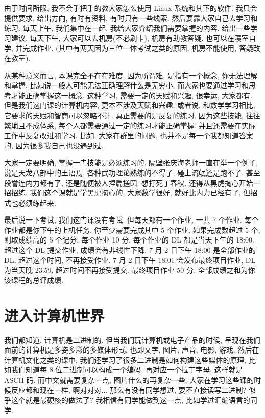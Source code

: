 \documentclass[a4paper]{ctexart}
\begin{document}
由于时间所限, 我不会手把手的教大家怎么使用 Linux 系统和其下的软件. 我只会提供要求, 给出方向,
有时有资料, 有时只有一些线索. 然后要靠大家自己去学习和练习. 每天上午, 我们集中在一起,
我给大家介绍我们需要掌握的内容, 给出一些学习建议. 每天下午, 大家可以去机房(不必刷卡), 机房有助教答疑.
也可以在寝室自学, 并完成作业. (其中有两天因为三位一体考试之类的原因, 机房不能使用, 答疑改在教室).

从某种意义而言, 本课完全不存在难度. 因为所谓难, 是指有一个概念, 你无法理解和掌握.
比如说一般人可能无法正确理解什么是无穷小, 而大家也要通过学习和思考才能正确掌握这一概念. 这种学习,
需要一定的天赋和兴趣, 很幸运, 大家都有. 但是我们这门课的计算机内容, 更本不涉及天赋和兴趣. 或者说,
和数学学习相比, 它要求的天赋和智商可以忽略不计. 真正需要的是反复的练习. 因为这些技能,
往往繁琐且不成体系, 每个人都需要通过一定的练习才能正确掌握. 并且还需要在实际工作中反复改进和学习.
比如, 大家在群里的问题, 也并不是每一个我都知道答案的, 因为很多我自己也没遇到过.

大家一定要明确, 掌握一门技能是必须练习的. 隔壁张庆海老师一直在举一个例子, 说是天龙八部中的王语焉,
各种武功理论熟练的不得了, 碰上流氓还是跑不了. 甚至段誉连内力都有了, 还是随便被人捏扁搓圆.
想打死丁春秋, 还得从黑虎掏心开始一招招练. 我们这个课就是学黑虎掏心的, 大家数学很好, 就好比内力已经有了, 但招式也必须练起来.

最后说一下考试, 我们这门课没有考试. 但每天都有一个作业, 一共 7 个作业.
每个作业都是你下午的上机任务. 你至少需要完成其中 5 个作业, 如果完成数超过 5 个,
则取成绩高的 5 个记分. 每个作业 10 分. 每个作业的 DL 都是当天下午的 18:00.
超过这个 DL 提交作业, 成绩会有非线性下降. 7 月 2 日下午 18:00 是全部作业的 DL,
超过这个时间, 不再接受作业. 7 月 2 日下午 18:01 会发布最终项目作业, DL
为当天晚 23:59, 超过时间不再接受提交. 最终项目作业 50 分.
全部成绩之和为你该课程的总评成绩.

\section{进入计算机世界}

我们都知道, 计算机是二进制的. 但当我们玩计算机或电子产品的时候, 呈现在我们面前的计算机是多姿多彩的多媒体形式.
也即文字, 图片, 声音, 电影, 游戏. 然后在计算机文化之类的课中, 我们还学习了很多二进制是如何构建这些媒体的原理,
比如我们知道每 8 位二进制可以构成一个编码, 再对应一个拉丁字母, 这样就是 ASCII 码. 而中文就需要复杂一点,
图片什么的再复杂一些. 大家在学习这些课的时候反应都和现在一样, 啊对对对... 那么有没有同学想过,
要不直接读写二进制? 似乎这个就是最硬核的做法了? 我相信有同学能做到这一点, 比如学过汇编语言的同学.
\end{document}
